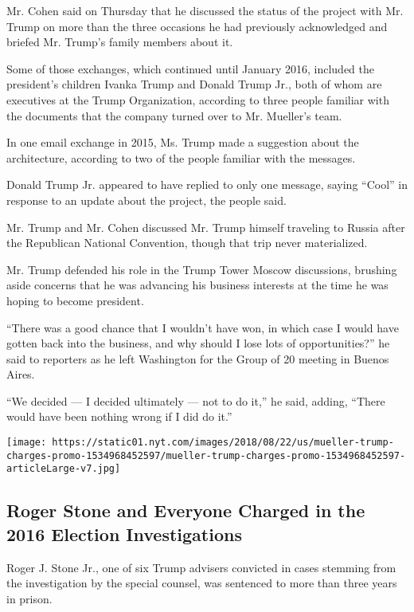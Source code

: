 Mr. Cohen said on Thursday that he discussed the status of the project
with Mr. Trump on more than the three occasions he had previously
acknowledged and briefed Mr. Trump's family members about it.

Some of those exchanges, which continued until January 2016, included
the president's children Ivanka Trump and Donald Trump Jr., both of whom
are executives at the Trump Organization, according to three people
familiar with the documents that the company turned over to Mr.
Mueller's team.

In one email exchange in 2015, Ms. Trump made a suggestion about the
architecture, according to two of the people familiar with the messages.

Donald Trump Jr. appeared to have replied to only one message, saying
``Cool'' in response to an update about the project, the people said.

Mr. Trump and Mr. Cohen discussed Mr. Trump himself traveling to Russia
after the Republican National Convention, though that trip never
materialized.

Mr. Trump defended his role in the Trump Tower Moscow discussions,
brushing aside concerns that he was advancing his business interests at
the time he was hoping to become president.

``There was a good chance that I wouldn't have won, in which case I
would have gotten back into the business, and why should I lose lots of
opportunities?'' he said to reporters as he left Washington for the
Group of 20 meeting in Buenos Aires.

``We decided --- I decided ultimately --- not to do it,'' he said,
adding, ``There would have been nothing wrong if I did do it.''

\href{https://www.nytimes.com/interactive/2018/08/21/us/mueller-trump-charges.html}{}

\texttt{[image: https://static01.nyt.com/images/2018/08/22/us/mueller-trump-charges-promo-1534968452597/mueller-trump-charges-promo-1534968452597-articleLarge-v7.jpg]}

\hypertarget{roger-stone-and-everyone-charged-in-the-2016-election-investigations}{%
\subsection{Roger Stone and Everyone Charged in the 2016 Election
Investigations}\label{roger-stone-and-everyone-charged-in-the-2016-election-investigations}}

Roger J. Stone Jr., one of six Trump advisers convicted in cases
stemming from the investigation by the special counsel, was sentenced to
more than three years in prison.

